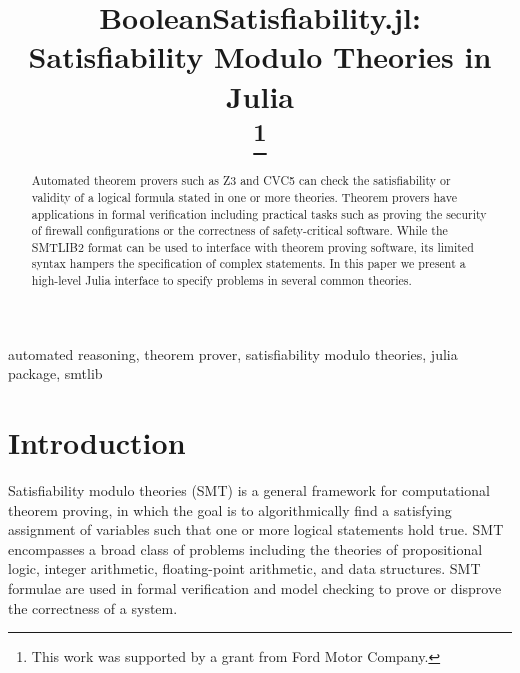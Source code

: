 \documentclass[conference]{IEEEtran}
\begin{document}
\title{BooleanSatisfiability.jl: Satisfiability Modulo Theories in Julia\\
\thanks{This work was supported by a grant from Ford Motor Company.} %
}

\author{
\and
{}
\and
{}
}

\maketitle

\begin{abstract}
Automated theorem provers such as Z3 and CVC5 can check the satisfiability or validity of a logical formula stated in one or more theories. Theorem provers have applications in formal verification including practical tasks such as proving the security of firewall configurations or the correctness of safety-critical software. While the SMTLIB2 format can be used to interface with theorem proving software, its limited syntax hampers the specification of complex statements. In this paper we present a high-level Julia interface to specify problems in several common theories.
\end{abstract}

\begin{IEEEkeywords}
automated reasoning, theorem prover, satisfiability modulo theories, julia package, smtlib
\end{IEEEkeywords}

\section{Introduction}
Satisfiability modulo theories (SMT) is a general framework for computational theorem proving, in which the goal is to algorithmically find a satisfying assignment of variables such that one or more logical statements hold true. SMT encompasses a broad class of problems including the theories of propositional logic, integer arithmetic, floating-point arithmetic, and data structures. SMT formulae are used in formal verification and model checking to prove or disprove the correctness of a system.
\end{document}
